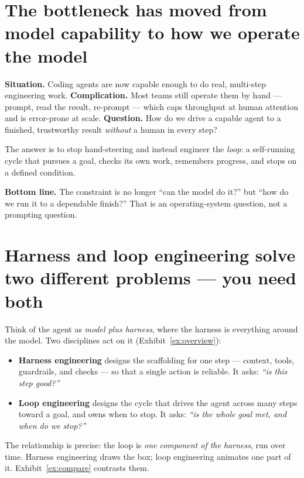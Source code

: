 \documentclass[11pt]{article}
\newcommand{\sotag}[1]{\textcolor{mckblue}{\textbf{#1}}}
\begin{document}
\section{The bottleneck has moved from model capability to how we operate the model}
\textbf{Situation.} Coding agents are now capable enough to do real, multi-step
engineering work. \textbf{Complication.} Most teams still operate them by hand
--- prompt, read the result, re-prompt --- which caps throughput at human
attention and is error-prone at scale. \textbf{Question.} How do we drive a
capable agent to a finished, trustworthy result \emph{without} a human in every
step?

The answer is to stop hand-steering and instead engineer the \emph{loop}: a
self-running cycle that pursues a goal, checks its own work, remembers progress,
and stops on a defined condition.

\begin{bottomline}
\textbf{Bottom line.} The constraint is no longer ``can the model do it?'' but
``how do we run it to a dependable finish?'' That is an operating-system
question, not a prompting question.
\end{bottomline}

\section{Harness and loop engineering solve two different problems --- you need both}
Think of the agent as \emph{model plus harness}, where the harness is everything
around the model. Two disciplines act on it (Exhibit~\ref{ex:overview}):

\begin{itemize}
\item \sotag{Harness engineering} designs the scaffolding for one step ---
context, tools, guardrails, and checks --- so that a single action is reliable.
It asks: \emph{``is this step good?''}
\item \sotag{Loop engineering} designs the cycle that drives the agent across
many steps toward a goal, and owns when to stop. It asks: \emph{``is the whole
goal met, and when do we stop?''}
\end{itemize}

The relationship is precise: the loop is \emph{one component of the harness},
run over time. Harness engineering draws the box; loop engineering animates one
part of it. Exhibit~\ref{ex:compare} contrasts them.
\end{document}
